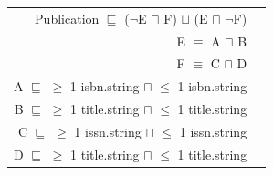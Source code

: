 \documentclass[a4paper,fontsize=11pt]{scrartcl}
\newenvironment{DL}{
  \vspace{0cm}
	\begin{center}
  \begin{tabular}{r l}

}{
  \end{tabular}
	\end{center}
}
\begin{document}
\begin{DL}
Publication $\sqsubseteq$ ($\neg$E $\sqcap$ F) $\sqcup$ (E $\sqcap$ $\neg$F) \\ 
E $\equiv$ A $\sqcap$ B \\
F $\equiv$ C $\sqcap$ D \\
A $\sqsubseteq$ $\geq$ 1 isbn.string $\sqcap$ $\leq$ 1 isbn.string \\
B $\sqsubseteq$ $\geq$ 1 title.string $\sqcap$ $\leq$ 1 title.string \\
C $\sqsubseteq$ $\geq$ 1 issn.string $\sqcap$ $\leq$ 1 issn.string \\
D $\sqsubseteq$ $\geq$ 1 title.string $\sqcap$ $\leq$ 1 title.string \\
\end{DL}

\end{document}
